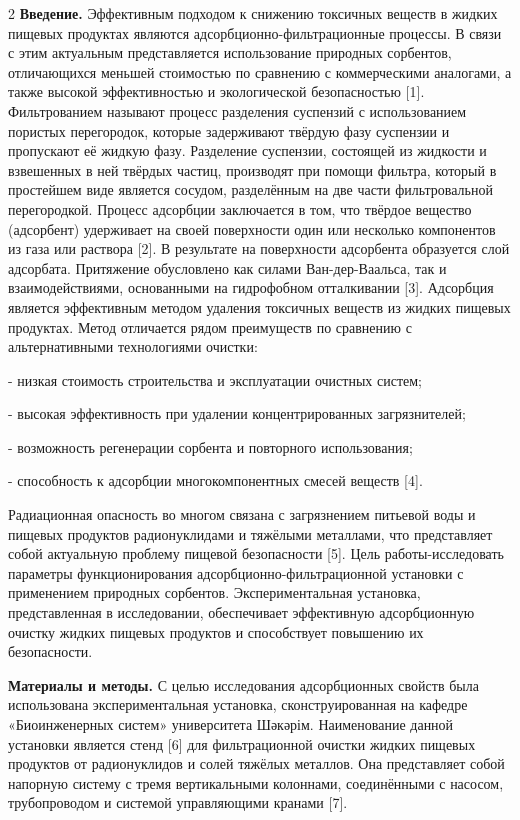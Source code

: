 \begin{multicols}{2}
{\bfseries Введение.} Эффективным подходом к снижению токсичных веществ в
жидких пищевых продуктах являются адсорбционно-фильтрационные процессы.
В связи с этим актуальным представляется использование природных
сорбентов, отличающихся меньшей стоимостью по сравнению с коммерческими
аналогами, а также высокой эффективностью и экологической безопасностью
{[}1{]}. Фильтрованием называют процесс разделения суспензий с
использованием пористых перегородок, которые задерживают твёрдую фазу
суспензии и пропускают её жидкую фазу. Разделение суспензии, состоящей
из жидкости и взвешенных в ней твёрдых частиц, производят при помощи
фильтра, который в простейшем виде является сосудом, разделённым на две
части фильтровальной перегородкой. Процесс адсорбции заключается в том,
что твёрдое вещество (адсорбент) удерживает на своей поверхности один
или несколько компонентов из газа или раствора {[}2{]}. В результате на
поверхности адсорбента образуется слой адсорбата. Притяжение обусловлено
как силами Ван-дер-Ваальса, так и взаимодействиями, основанными на
гидрофобном отталкивании {[}3{]}. Адсорбция является эффективным методом
удаления токсичных веществ из жидких пищевых продуктах. Метод отличается
рядом преимуществ по сравнению с альтернативными технологиями очистки:

- низкая стоимость строительства и эксплуатации очистных систем;

- высокая эффективность при удалении концентрированных загрязнителей;

- возможность регенерации сорбента и повторного использования;

- способность к адсорбции многокомпонентных смесей веществ {[}4{]}.

Радиационная опасность во многом связана с загрязнением питьевой воды и
пищевых продуктов радионуклидами и тяжёлыми металлами, что представляет
собой актуальную проблему пищевой безопасности {[}5{]}. Цель
работы-исследовать параметры функционирования
адсорбционно-фильтрационной установки с применением природных сорбентов.
Экспериментальная установка, представленная в исследовании, обеспечивает
эффективную адсорбционную очистку жидких пищевых продуктов и
способствует повышению их безопасности.

{\bfseries Материалы и методы.} С целью исследования адсорбционных свойств
была использована экспериментальная установка, сконструированная на
кафедре «Биоинженерных систем» университета Шәкәрім. Наименование данной
установки является стенд {[}6{]} для фильтрационной очистки жидких
пищевых продуктов от радионуклидов и солей тяжёлых металлов. Она
представляет собой напорную систему с тремя вертикальными колоннами,
соединёнными с насосом, трубопроводом и системой управляющими кранами
{[}7{]}.
\end{multicols}

